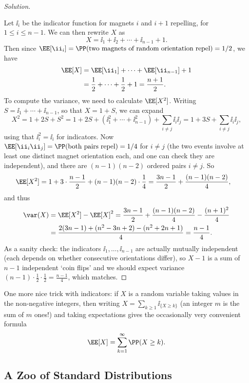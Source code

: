 \begin{proof}[Solution]
\begin{center}
	\end{center}
	Let $\ii_i$ be the indicator function for magnets $i$ and $i+1$ repelling, for $1 \leq i \leq n - 1$. We can then rewrite $X$ as 
	$$
	X = \ii_1 + \ii_2 + \cdots + \ii_{n - 1} + 1.
	$$
	Then since $\EE[\ii_i] = \PP(\text{two magnets of random orientation repel}) = 1/2$, we have
	\begin{align*}
		\EE[X] &= \EE[\ii_1] + \cdots + \EE[\ii_{n - 1}] + 1\\
		&= \frac{1}{2} + \cdots + \frac{1}{2} + 1 = \frac{n + 1}{2}.
	\end{align*}
	To compute the variance, we need to calculate $\EE[X^2]$. Writing $S = \ii_1 + \cdots + \ii_{n-1}$, so that $X = 1 + S$, we can expand
	$$
	X^2 = 1 + 2S + S^2 = 1 + 2S + (\ii_1^2 + \cdots + \ii_{n-1}^2) + \sum_{i \neq j} \ii_i \ii_j = 1 + 3S + \sum_{i \neq j} \ii_i \ii_j,
	$$
	using that $\ii_i^2 = \ii_i$ for indicators. Now $\EE[\ii_i \ii_j] = \PP(\text{both pairs repel}) = 1/4$ for $i \neq j$ (the two events involve at least one distinct magnet orientation each, and one can check they are independent), and there are $(n-1)(n-2)$ ordered pairs $i \neq j$. So
	\begin{align*}
		\EE[X^2] &= 1 + 3 \cdot \frac{n - 1}{2} + (n - 1)(n - 2)\cdot\frac{1}{4} = \frac{3n - 1}{2} + \frac{(n-1)(n-2)}{4},
	\end{align*}
	and thus
	\begin{align*}
		\var(X) &= \EE[X^2] - \EE[X]^2 = \frac{3n - 1}{2} + \frac{(n-1)(n-2)}{4} - \frac{(n + 1)^2}{4} \\
		&= \frac{2(3n - 1) + (n^2 - 3n + 2) - (n^2 + 2n + 1)}{4} = \frac{n - 1}{4}.
	\end{align*}
	As a sanity check: the indicators $\ii_1, \dots, \ii_{n-1}$ are actually mutually independent (each depends on whether consecutive orientations differ), so $X - 1$ is a sum of $n - 1$ independent `coin flips' and we should expect variance $(n-1) \cdot \frac{1}{2} \cdot \frac{1}{2} = \frac{n-1}{4}$, which matches.
\end{proof}

One more nice trick with indicators: if $X$ is a random variable taking values in the non-negative integers, then writing $X = \sum_{k \geq 1} \ii_{\{X \geq k\}}$ (an integer $m$ is the sum of $m$ ones!) and taking expectations gives the occasionally very convenient formula
$$
\EE[X] = \sum_{k = 1}^{\infty} \PP(X \geq k).
$$

\subsection{A Zoo of Standard Distributions}

